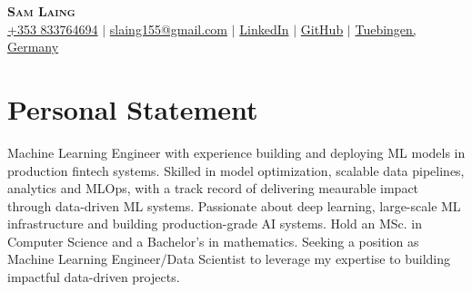 \documentclass[letterpaper,10pt]{article}
\begin{document}

\begin{center}
    \textbf{\Huge \scshape Sam Laing} \\ \vspace{3pt}
    \small
    \faMobile \hspace{.5pt} \href{tel:353833764694}{+353 833764694}
    $|$
    \faAt \hspace{.5pt} \href{slaing155@gmail.com}{slaing155@gmail.com}
    $|$
    \faLinkedinSquare \hspace{.5pt} \href{https://www.linkedin.com/in/sam-laing-196403214}{LinkedIn}
    $|$
    \faGithub \hspace{.5pt} \href{https://github.com/sam-laing}{GitHub}
    $|$
    \faMapMarker \hspace{.5pt} \href{https://maps.app.goo.gl/zDdAp6SFpdj8fM548}{Tuebingen, Germany}
\end{center}

\section{Personal Statement}
Machine Learning Engineer with experience building and deploying ML models in production fintech systems. Skilled in model optimization, scalable data pipelines, analytics and MLOps, with a track record of delivering meaurable impact through data-driven ML systems. Passionate about deep learning, large-scale ML infrastructure and building production-grade AI systems. Hold an MSc. in Computer Science and a Bachelor's in mathematics. Seeking a position as Machine Learning Engineer/Data Scientist to leverage my expertise to building impactful data-driven projects. 


\end{document}
